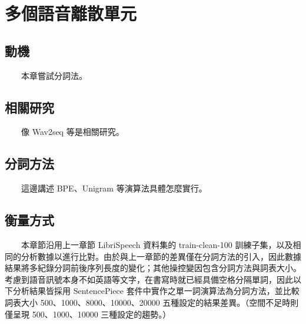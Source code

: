 
\chapter{多個語音離散單元}   

    {   
{     
\section{動機}            　　本章嘗試分詞法。
\section{相關研究} 　　像 Wav2seq \cite{wu_wav2seq_2023}  等是相關研究。
\section{分詞方法} 　　這邊講述 BPE、Unigram 等演算法具體怎麼實行。}
\section{衡量方式}
　　本章節沿用上一章節 LibriSpeech 資料集的 train-clean-100 訓練子集，以及相同的分析數據以進行比對。由於與上一章節的差異僅在分詞方法的引入，因此數據結果將多紀錄分詞前後序列長度的變化；其他操控變因包含分詞方法與詞表大小。考慮到語音訊號本身不如英語等文字，在書寫時就已經具備空格分隔單詞，因此以下分析結果皆採用 SentencePiece 套件中實作之單一詞演算法為分詞方法，並比較詞表大小 500、1000、8000、10000、20000 五種設定的結果差異。（空間不足時則僅呈現 500、1000、10000 三種設定的趨勢。）  }  %

